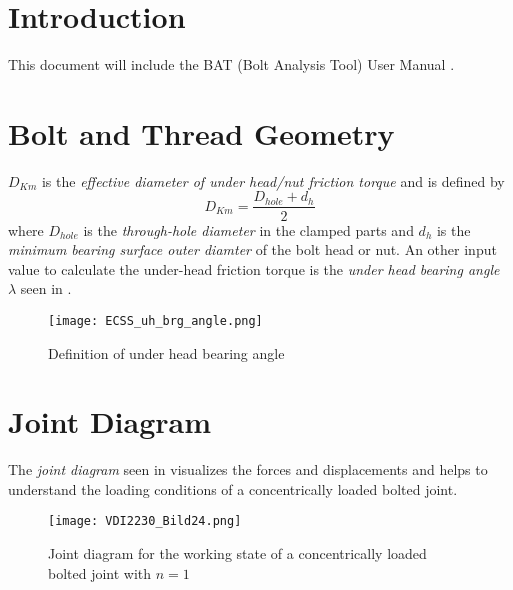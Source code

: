 \chapter{Introduction}
This document will include the BAT (Bolt Analysis Tool) User Manual \cite{ESAPSS} \cite{ECSS_HB_32_23A} \cite{VDI2230_1}.

\chapter{Bolt and Thread Geometry}
$D_{Km}$ is the \emph{effective diameter of under head/nut friction torque} and is defined by 
\begin{equation}
  D_{Km} = \frac{D_{hole}+d_h}{2}
  \label{equ:dkm}
\end{equation}
where $D_{hole}$ is the \emph{through-hole diameter} in the clamped parts and $d_h$ is the 
\emph{minimum bearing surface outer diamter} of the bolt head or nut. An other input value to calculate
the under-head friction torque  is the \emph{under head bearing angle} $\lambda$ seen in 
.
\begin{figure}[!htpb]
  \centering
  \texttt{[image: ECSS\_uh\_brg\_angle.png]}
  \caption{Definition of under head bearing angle \cite{ECSS_HB_32_23A}}
  \label{fig:ecss_uh_brg_angle}
\end{figure}

\chapter{Joint Diagram}
\label{ch:jointdiag}
The \emph{joint diagram} seen in  \cite{VDI2230_1} visualizes the forces and 
displacements and helps to understand the loading conditions of a concentrically loaded bolted joint. 
\begin{figure}[!htpb]
  \centering
  \texttt{[image: VDI2230\_Bild24.png]}
  \caption{Joint diagram for the working state of a concentrically loaded \\ bolted joint with $n=1$ \cite{VDI2230_1}}
  \label{fig:joint_diagram}
\end{figure}

